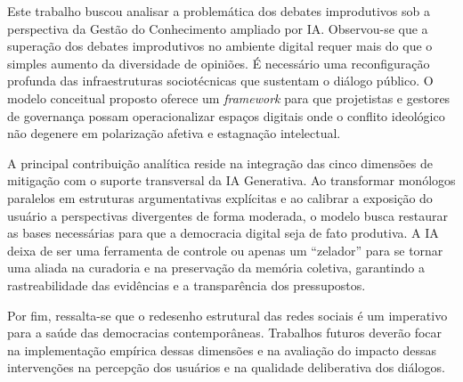 \documentclass[conference]{IEEEtran} \IEEEoverridecommandlockouts %
\begin{document}
Este trabalho buscou analisar a problemática dos debates improdutivos sob a perspectiva da Gestão do Conhecimento ampliado por IA. Observou-se que a superação dos debates improdutivos no ambiente digital requer mais do que o simples aumento da diversidade de opiniões. É necessário uma reconfiguração profunda das infraestruturas sociotécnicas que sustentam o diálogo público. O modelo conceitual proposto oferece um \textit{framework} para que projetistas e gestores de governança possam operacionalizar espaços digitais onde o conflito ideológico não degenere em polarização afetiva e estagnação intelectual.

A principal contribuição analítica reside na integração das cinco dimensões de mitigação com o suporte transversal da IA Generativa. Ao transformar monólogos paralelos em estruturas argumentativas explícitas e ao calibrar a exposição do usuário a perspectivas divergentes de forma moderada, o modelo busca restaurar as bases necessárias para que a democracia digital seja de fato produtiva. A IA deixa de ser uma ferramenta de controle ou apenas um ``zelador'' para se tornar uma aliada na curadoria e na preservação da memória coletiva, garantindo a rastreabilidade das evidências e a transparência dos pressupostos.

Por fim, ressalta-se que o redesenho estrutural das redes sociais é um imperativo para a saúde das democracias contemporâneas. Trabalhos futuros deverão focar na implementação empírica dessas dimensões e na avaliação do impacto dessas intervenções na percepção dos usuários e na qualidade deliberativa dos diálogos.






\end{document}
